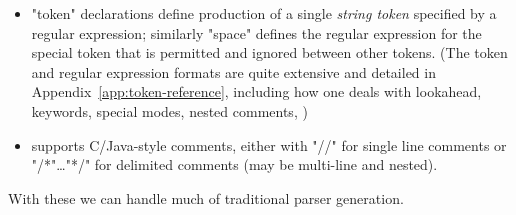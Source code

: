 \documentclass[11pt]{article} %
\begin{document}
\begin{notation}
\begin{itemize}
  \item "token" declarations define production of a single \emph{string token} specified by a
    regular expression; similarly "space" defines the regular expression for the special token that
    is permitted and ignored between other tokens. (The token and regular expression formats are
    quite extensive and detailed in Appendix~\ref{app:token-reference}, including how one deals with
    lookahead, keywords, special modes, nested comments, \etc)

  \item \HAX supports C/Java-style comments, either with "//" for single line comments or "/*"…"*/" for
    delimited comments (may be multi-line and nested).

  \end{itemize}
\end{notation}

With these we can handle much of traditional parser generation.
\end{document}
